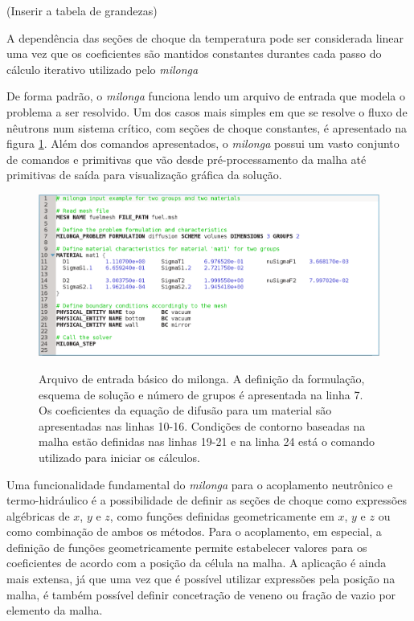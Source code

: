 (Inserir a tabela de grandezas)

A dependência das seções de choque da temperatura pode ser considerada linear uma vez que
os coeficientes são mantidos constantes durantes cada passo do cálculo iterativo utilizado
pelo \textit{milonga}

De forma padrão, o \textit{milonga} funciona lendo um arquivo de entrada que modela o
problema a ser resolvido. Um dos casos mais simples em que se resolve o fluxo de nêutrons
num sistema crítico, com seções de choque constantes, é apresentado na figura \ref{fig:inputmilonga}.
Além dos comandos apresentados, o \textit{milonga} possui um vasto conjunto de comandos e primitivas
que vão desde pré-processamento da malha até primitivas de saída para visualização gráfica da
solução.

\begin{figure}[htb]
  \caption{Arquivo de entrada básico do milonga. A definição da formulação,
    esquema de solução e número de grupos é apresentada na linha 7. Os coeficientes
    da equação de difusão para um material são apresentadas nas linhas 10-16.
    Condições de contorno baseadas na malha estão definidas nas linhas 19-21 e na linha 24
  está o comando utilizado para iniciar os cálculos.}
  \centering\includegraphics[scale=0.19]{figuras/milonga_example2.png}
  \label{fig:inputmilonga}
\end{figure}

Uma funcionalidade fundamental do \textit{milonga} para o acoplamento neutrônico
e termo-hidráulico é a possibilidade de definir as seções de choque como expressões
algébricas de $x$, $y$ e $z$, como funções definidas geometricamente em $x$, $y$ e $z$
ou como combinação de ambos os métodos. Para o acoplamento, em especial, a definição
de funções geometricamente permite estabelecer valores para os coeficientes de
acordo com a posição da célula na malha. A aplicação é ainda mais extensa, já que
uma vez que é possível utilizar expressões pela posição na malha, é também
possível definir concetração de veneno ou fração de vazio por elemento da malha.

